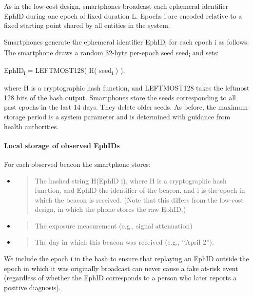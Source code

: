 \documentclass{article}
\begin{document}
As in the low-cost design, smartphones broadcast each ephemeral
identifier EphID during one epoch of fixed duration L. Epochs i are
encoded relative to a fixed starting point shared by all entities in the
system.

Smartphones generate the ephemeral identifier EphID\textsubscript{i} for
each epoch i as follows. The smartphone draws a random 32-byte per-epoch
seed seed\textsubscript{i} and sets:

EphID\textsubscript{i} = LEFTMOST128( H( seed\textsubscript{i} ) ),

where H is a cryptographic hash function, and LEFTMOST128 takes the
leftmost 128 bits of the hash output. Smartphones store the seeds
corresponding to all past epochs in the last 14 days. They delete older
seeds. As before, the maximum storage period is a system parameter and
is determined with guidance from health authorities.

\hypertarget{local-storage-of-observed-ephids}{%
\paragraph{Local storage of observed
EphIDs}\label{local-storage-of-observed-ephids}}

For each observed beacon the smartphone stores:

\begin{itemize}
\item
  \begin{quote}
  The hashed string H(EphID \textbar\textbar{} i), where H is a
  cryptographic hash function, and EphID the identifier of the beacon,
  and i is the epoch in which the beacon is received. (Note that this
  differs from the low-cost design, in which the phone stores the raw
  EphID.)
  \end{quote}
\item
  \begin{quote}
  The exposure measurement (e.g., signal attenuation)
  \end{quote}
\item
  \begin{quote}
  The day in which this beacon was received (e.g., ``April 2'').
  \end{quote}
\end{itemize}

We include the epoch i in the hash to ensure that replaying an EphID
outside the epoch in which it was originally broadcast can never cause a
fake at-risk event (regardless of whether the EphID corresponds to a
person who later reports a positive diagnosis).
\end{document}
